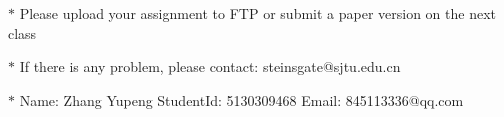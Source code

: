 \documentclass[12pt,a4paper]{article}
\theoremstyle{definition}
\numberwithin{equation}{section}
\numberwithin{figure}{section}
\begin{document}
\noindent

\noindent{}
\begin{center}
\footnotesize{\color{red}$*$ Please upload your assignment to FTP or submit a paper version on the next class}

\footnotesize{\color{red}$*$ If there is any problem, please contact: steinsgate@sjtu.edu.cn}

\footnotesize{\color{blue}$*$ Name: Zhang Yupeng \quad StudentId: 5130309468 \quad Email: 845113336@qq.com}
\end{center}
\end{document}
